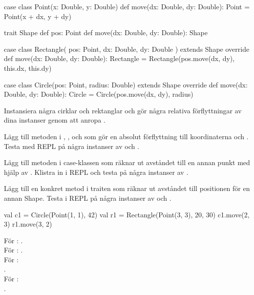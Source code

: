 \begin{Code}
case class Point(x: Double, y: Double) {
  def move(dx: Double, dy: Double): Point = Point(x + dx, y + dy)
}

trait Shape {
  def pos: Point
  def move(dx: Double, dy: Double): Shape
}

case class Rectangle(
  pos: Point,
  dx: Double,
  dy: Double
) extends Shape {
  override def move(dx: Double, dy: Double): Rectangle =
    Rectangle(pos.move(dx, dy), this.dx, this.dy)
}

case class Circle(pos: Point, radius: Double) extends Shape {
  override def move(dx: Double, dy: Double): Circle =
    Circle(pos.move(dx, dy), radius)
}
\end{Code}

\Subtask Instansiera några cirklar och rektanglar och gör några relativa förflyttningar av dina instanser genom att anropa .

\Subtask Lägg till metoden  i , ,  och  som gör en absolut förflyttning till koordinaterna  och . Testa med REPL på några instanser av  och .

\Subtask Lägg till metoden  i case-klassen  som räknar ut avståndet till en annan punkt med hjälp av . Klistra in i REPL och testa på några instanser av .

\Subtask Lägg till en konkret metod  i traiten  som räknar ut avståndet till positionen för en annan Shape. Testa i REPL på några instanser av  och .

\SOLUTION


\TaskSolved \what


\SubtaskSolved
\begin{Code}
val c1 = Circle(Point(1, 1), 42)
val r1 = Rectangle(Point(3, 3), 20, 30)
c1.move(2, 3)
r1.move(3, 2)
\end{Code}

\SubtaskSolved  För : . \\
För : . \\
För :  \\
. \\
För :  \\
.

